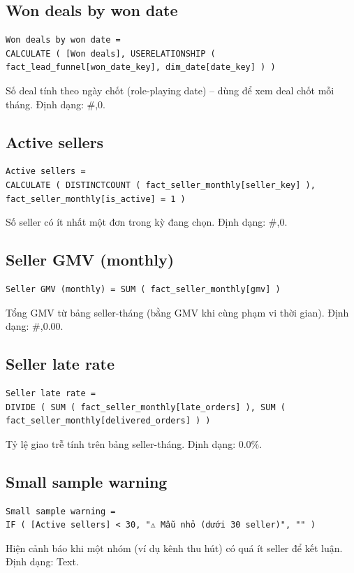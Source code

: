 \subsection*{Won deals by won date}
\begin{lstlisting}[language={}]
Won deals by won date =
CALCULATE ( [Won deals], USERELATIONSHIP ( fact_lead_funnel[won_date_key], dim_date[date_key] ) )
\end{lstlisting}
Số deal tính theo ngày chốt (role-playing date) – dùng để xem deal chốt mỗi tháng. Định dạng: \#,0.

\subsection*{Active sellers}
\begin{lstlisting}[language={}]
Active sellers =
CALCULATE ( DISTINCTCOUNT ( fact_seller_monthly[seller_key] ), fact_seller_monthly[is_active] = 1 )
\end{lstlisting}
Số seller có ít nhất một đơn trong kỳ đang chọn. Định dạng: \#,0.

\subsection*{Seller GMV (monthly)}
\begin{lstlisting}[language={}]
Seller GMV (monthly) = SUM ( fact_seller_monthly[gmv] )
\end{lstlisting}
Tổng GMV từ bảng seller-tháng (bằng GMV khi cùng phạm vi thời gian). Định dạng: \#,0.00.

\subsection*{Seller late rate}
\begin{lstlisting}[language={}]
Seller late rate =
DIVIDE ( SUM ( fact_seller_monthly[late_orders] ), SUM ( fact_seller_monthly[delivered_orders] ) )
\end{lstlisting}
Tỷ lệ giao trễ tính trên bảng seller-tháng. Định dạng: 0.0\%.

\subsection*{Small sample warning}
\begin{lstlisting}[language={}]
Small sample warning =
IF ( [Active sellers] < 30, "⚠ Mẫu nhỏ (dưới 30 seller)", "" )
\end{lstlisting}
Hiện cảnh báo khi một nhóm (ví dụ kênh thu hút) có quá ít seller để kết luận. Định dạng: Text.
